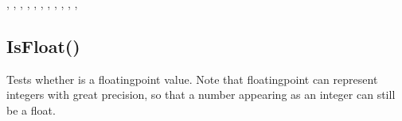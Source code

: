\documentclass[letterpaper,10pt,english]{sphinxmanual}
\begin{document}
\sphinxAtStartPar
{}

\begin{sphinxVerbatim}[commandchars=\\\{\}]
\end{sphinxVerbatim}

\sphinxAtStartPar
{}

\sphinxAtStartPar
{}, ,   , , ,   , , ,   , , ,   

\ignorespaces 

\subsection{IsFloat()}
\label{\detokenize{reference/peblenvironment:isfloat}}\label{\detokenize{reference/peblenvironment:index-37}}
\sphinxAtStartPar
{}

\sphinxAtStartPar
Tests whether  is a floating\sphinxhyphen{}point   value. Note that floating\sphinxhyphen{}point can represent integers with great   precision, so that a number appearing as an integer can still be a   float.

\sphinxAtStartPar
{}

\begin{sphinxVerbatim}[commandchars=\\\{\}]
\end{sphinxVerbatim}

\sphinxAtStartPar
{}
\end{document}
